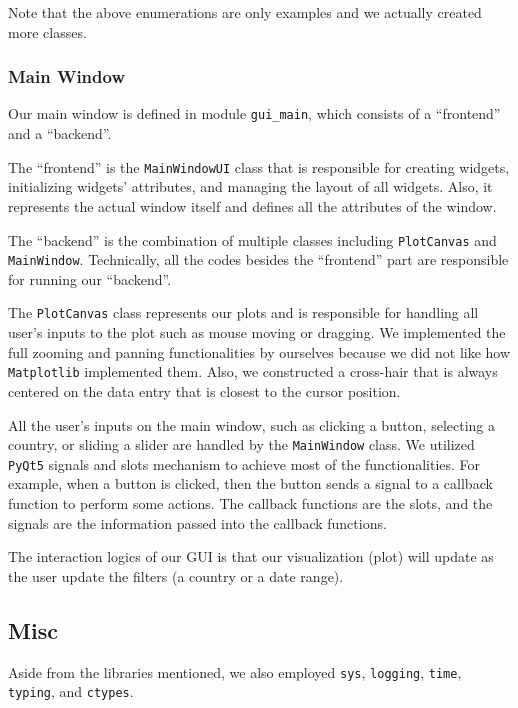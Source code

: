 \documentclass[fontsize=11pt]{article}
\begin{document}
    Note that the above enumerations are only examples and we actually created more classes.

    \subsubsection{Main Window}

    Our main window is defined in module \verb|gui_main|, which consists of a ``frontend'' and a ``backend''.

    The ``frontend'' is the \verb|MainWindowUI| class that is responsible for creating widgets, initializing widgets' attributes, and managing the layout of all widgets. Also, it represents the actual window itself and defines all the attributes of the window.

    The ``backend'' is the combination of multiple classes including \verb|PlotCanvas| and \verb|MainWindow|. Technically, all the codes besides the ``frontend'' part are responsible for running our ``backend''.

    The \verb|PlotCanvas| class represents our plots and is responsible for handling all user's inputs to the plot such as mouse moving or dragging. We implemented the full zooming and panning functionalities by ourselves because we did not like how \verb|Matplotlib| implemented them. Also, we constructed a cross-hair that is always centered on the data entry that is closest to the cursor position.

    All the user's inputs on the main window, such as clicking a button, selecting a country, or sliding a slider are handled by the \verb|MainWindow| class. We utilized \verb|PyQt5| signals and slots mechanism to achieve most of the functionalities. For example, when a button is clicked, then the button sends a signal to a callback function to perform some actions. The callback functions are the slots, and the signals are the information passed into the callback functions.

    The interaction logics of our GUI is that our visualization (plot) will update as the user update the filters (a country or a date range).

    \subsection{Misc}

    Aside from the libraries mentioned, we also employed \verb|sys|, \verb|logging|, \verb|time|, \verb|typing|, and \verb|ctypes|.
\end{document}
